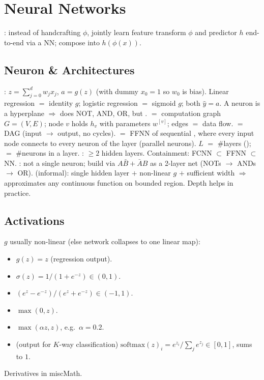 \section{Neural Networks}
: instead of handcrafting $\phi$, jointly learn feature transform $\phi$ and predictor $h$ end-to-end via a NN; compose into $h(\phi(x))$.

\subsection{Neuron \& Architectures}
: $z{=}\sum_{j=0}^{d}w_jx_j$, $a{=}g(z)$ (with dummy $x_0{=}1$ so $w_0$ is bias). Linear regression $=$ identity $g$; logistic regression $=$ sigmoid $g$; both $\hat y{=}a$. A neuron is a hyperplane $\Rightarrow$ does NOT, AND, OR, but .
 $=$ computation graph $G{=}(V,E)$; node $v$ holds $h_v$ with parameters $w^{[v]}$; edges $=$ data flow.  $=$ DAG (input $\to$ output, no cycles).  $=$ FFNN of sequential , where every input node connects to every neuron of the layer (parallel neurons).  $L$ $=$ \#layers ();  $=$ \#neurons in a layer. : $\geq2$ hidden layers. Containment: FCNN $\subset$ FFNN $\subset$ NN.
: not a single neuron; build via $A\bar B+\bar AB$ as a 2-layer net (NOTs $\to$ ANDs $\to$ OR).
 (informal): single hidden layer $+$ non-linear $g$ $+$ sufficient width $\Rightarrow$ approximates any continuous function on bounded region. Depth helps in practice.

\subsection{Activations}
$g$ usually non-linear (else network collapses to one linear map):
\begin{itemize}
\item {} $g(z){=}z$ (regression output).
\item {} $\sigma(z){=}1/(1+e^{-z})\in(0,1)$.
\item {} $(e^z{-}e^{-z})/(e^z{+}e^{-z})\in({-}1,1)$.
\item {} $\max(0,z)$.
\item {} $\max(\alpha z,z)$, e.g.\ $\alpha{=}0.2$.
\item {} (output for $K$-way classification) $\mathrm{softmax}(z)_i{=}e^{z_i}/\!\sum_j e^{z_j}\in[0,1]$, sums to $1$.
\end{itemize}
Derivatives in miscMath.

